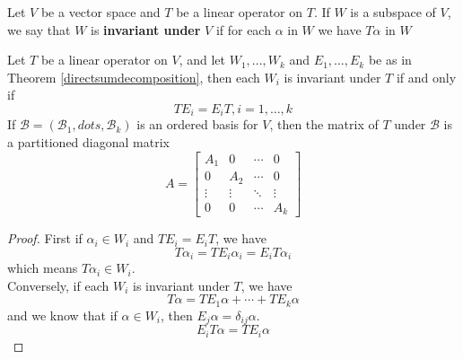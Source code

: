 \documentclass{article}
\begin{document}
\begin{dde}
	Let $V$ be a vector space and $T$ be a linear operator on $T$. If $W$ is a subspace of $V$, we say that $W$ is \textbf{invariant under} $V$ if for each $\alpha$ in $W$ we have $T\alpha$ in $W$
\end{dde}
\begin{thm}\label{Tcommuteprojection}
	Let $T$ be a linear operator on $V$, and let $W_1,\dots,W_k$ and $E_1,\dots,E_k$ be as in Theorem \ref{directsumdecomposition}, then each $W_i$ is invariant under $T$ if and only if
	\[TE_i=E_iT,i=1,\dots,k\]
	If $\mathcal{B}=(\mathcal{B}_1,dots,\mathcal{B}_k)$ is an ordered basis for $V$, then the matrix of $T$ under $\mathcal{B}$ is a partitioned diagonal matrix
	\[A=\begin{bmatrix}
		A_1&0&\cdots&0\\
		0&A_2&\cdots&0\\
		\vdots&\vdots&\ddots&\vdots\\
		0&0&\cdots&A_k
	\end{bmatrix}\]
\end{thm}
\begin{proof}
	First if $\alpha_i\in W_i$ and $TE_i=E_iT$, we have
	\[T\alpha_i=TE_i\alpha_i=E_iT\alpha_i\]
	which means $T\alpha_i\in W_i$.\\
	Conversely, if each $W_i$ is invariant under $T$, we have
	\[T\alpha=TE_1\alpha+\cdots+TE_k\alpha\]
	and we know that if $\alpha\in W_i$, then $E_j\alpha=\delta_{ij}\alpha$.
	\[E_iT\alpha=TE_i\alpha\] 
\end{proof}
\end{document}
